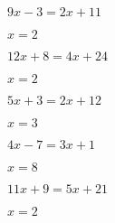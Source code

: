 \documentclass{ximera}
\begin{document}
\begin{exercise}
\begin{question} \( 9x - 3  = 2x + 11  \) \begin{oplossing} \(  x = 2  \) \end{oplossing} \end{question}
\begin{question} \( 12x + 8 = 4x + 24  \) \begin{oplossing} \(  x = 2  \) \end{oplossing} \end{question}
\begin{question} \( 5x + 3  = 2x + 12  \) \begin{oplossing} \(  x = 3  \) \end{oplossing} \end{question}
\begin{question} \( 4x - 7  = 3x + 1   \) \begin{oplossing} \(  x = 8  \) \end{oplossing} \end{question}
\begin{question} \( 11x + 9 = 5x + 21  \) \begin{oplossing} \(  x = 2  \) \end{oplossing} \end{question}

\end{exercise}
\end{document}
